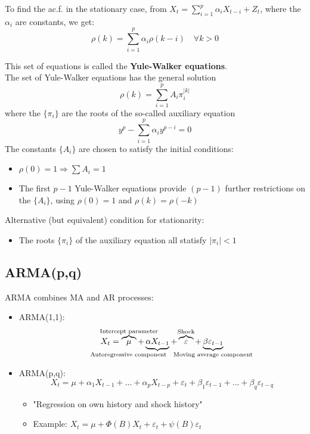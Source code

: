 To find the ac.f. in the stationary case, from $X_t=\sum_{i=1}^p \alpha_i X_{t-i}+Z_t$, where the $\alpha_i$ are constants, we get:\[\rho(k)=\sum_{i=1}^p \alpha_i\rho(k-i) \quad \forall k>0\]

This set of equations is called the \textbf{Yule-Walker equations}.\\

The set of Yule-Walker equations has the general solution \[
\rho(k) = \sum_{i=1}^p A_i\pi_i^{|k|}
\]
where the $\{\pi_i\}$ are the roots of the so-called auxiliary equation \[
y^p - \sum_{i=1}^p \alpha_i y^{p-i}=0
\]
The constants $\{A_i\}$ are chosen to satisfy the initial conditions:
\begin{itemize}
    \item $\rho(0)=1 \Rightarrow \sum A_i = 1 $
    \item The first ${p-1}$ Yule-Walker equations provide $(p-1)$ further restrictions on the $\{A_i\}$, using $\rho(0)=1$ and $\rho(k)=\rho(-k)$
\end{itemize}
Alternative (but equivalent) condition for stationarity:
\begin{itemize}
    \item The roots $\{\pi_i\}$ of the auxiliary equation all statisfy $|\pi_i|<1$
\end{itemize}


\subsection{ARMA(p,q)}

ARMA combines MA and AR processes:

\begin{itemize}
    \item ARMA(1,1): \[
    X_t = \overbrace{\mu}^{\mathclap{\text{Intercept parameter}}} + 
    \underbrace{\alpha X_{t-1}}_{\mathclap{\text{Autoregressive component}\phantom{ \quad \quad \quad \quad\quad \quad \quad}}} + 
    \overbrace{\varepsilon}^{\mathclap{\text{Shock}}} + 
    \underbrace{\beta \varepsilon_{t-1}}_{\mathclap{\text{Moving average component}}}
    \]
    \item ARMA(p,q): \[
    X_t=\mu+\alpha_1 X_{t-1} +...+\alpha_p X_{t-p}+ \varepsilon_t + \beta_1 \varepsilon_{t-1}+...+ \beta_q \varepsilon_{t-q}
    \]
    \begin{itemize}
        \item "Regression on own history and shock history"
        \item Example: \(X_t=\mu+\Phi(B)X_t+\varepsilon_t+\psi(B)\varepsilon_t \)
    \end{itemize}
\end{itemize}

